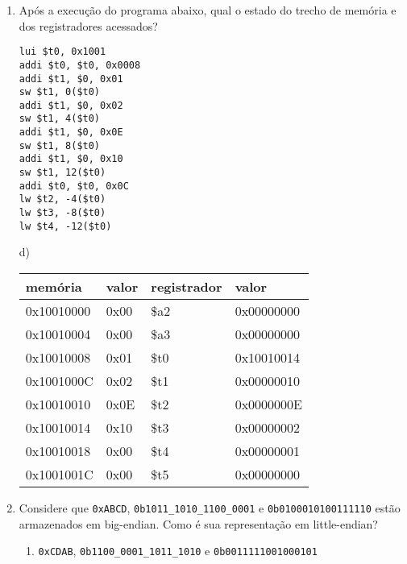 \documentclass{article}
\begin{document}
\begin{enumerate}
\pagebreak

\item \large Após a execução do programa abaixo, qual o estado do trecho de memória e dos registradores acessados?

\begin{center}
\begin{minipage}{0.4\textwidth}
\begin{lstlisting}[frame=single]
lui $t0, 0x1001
addi $t0, $t0, 0x0008
addi $t1, $0, 0x01
sw $t1, 0($t0)
addi $t1, $0, 0x02
sw $t1, 4($t0)
addi $t1, $0, 0x0E
sw $t1, 8($t0)
addi $t1, $0, 0x10
sw $t1, 12($t0)
addi $t0, $t0, 0x0C
lw $t2, -4($t0)
lw $t3, -8($t0)
lw $t4, -12($t0)
\end{lstlisting}
\end{minipage}

\begin{minipage}{0.55\textwidth}
d)
\begin{table}[H]
    \begin{tabular}{|l|l|l|l|}
    \hline
    memória    & valor & registrador & valor      \\ \hline
    0x10010000 & 0x00  & \$a2        & 0x00000000 \\ \hline
    0x10010004 & 0x00  & \$a3        & 0x00000000 \\ \hline
    0x10010008 & 0x01  & \$t0        & 0x10010014 \\ \hline
    0x1001000C & 0x02  & \$t1        & 0x00000010 \\ \hline
    0x10010010 & 0x0E  & \$t2        & 0x0000000E \\ \hline
    0x10010014 & 0x10  & \$t3        & 0x00000002 \\ \hline
    0x10010018 & 0x00  & \$t4        & 0x00000001 \\ \hline
    0x1001001C & 0x00  & \$t5        & 0x00000000 \\ \hline
    \end{tabular}%
\end{table}
\end{minipage}
\end{center}

\item \large Considere que \verb|0xABCD|, \verb|0b1011_1010_1100_0001| e \verb|0b0100010100111110|  estão armazenados em big-endian. Como é sua representação em little-endian?

\begin{spacing}{1.5}
\begin{enumerate}
\item \verb|0xCDAB|, \verb|0b1100_0001_1011_1010| e \verb|0b0011111001000101|%
\end{enumerate}
\end{spacing}
\bigskip


\end{enumerate}
\end{document}
